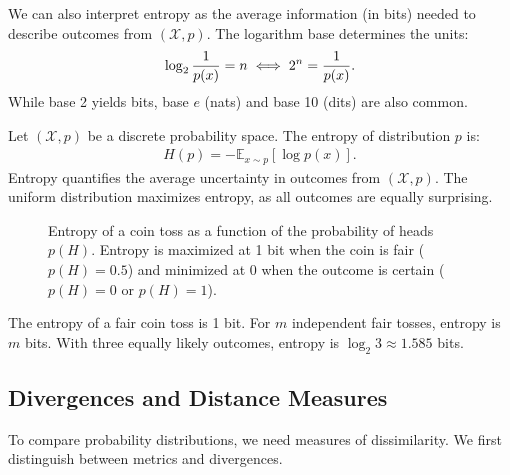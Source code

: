 We can also interpret entropy as the average information (in bits) needed to describe outcomes from $(\mathcal{X}, p)$. The logarithm base determines the units:
\begin{align}
	\label{eq:understand-log}
	\log_2{1 \over p(x)} = n \iff 2^n = {1 \over p(x)}.
\end{align}
While base 2 yields bits, base $e$ (nats) and base 10 (dits) are also common.

\begin{definition}
	Let $(\mathcal{X}, p)$ be a discrete probability space. The \textnormal{\sffamily entropy} of distribution $p$ is:
	\begin{align}
		\label{eq:entropy}
		H(p) = - \mathbb{E}_{x \sim p} \left[ \log{p(x)} \right].
	\end{align}
	Entropy quantifies the average uncertainty in outcomes from $(\mathcal{X}, p)$. The uniform distribution maximizes entropy, as all outcomes are equally surprising.
\end{definition}

\begin{figure}[H]
	\centering
	\caption{Entropy of a coin toss as a function of the probability of heads $p(H)$. Entropy is maximized at 1 bit when the coin is fair ($p(H)=0.5$) and minimized at 0 when the outcome is certain ($p(H)=0$ or $p(H)=1$).}%
	\label{fig:entropy-coin-toss}
\end{figure}

\begin{example}
	The entropy of a fair coin toss is 1 bit. For $m$ independent fair tosses, entropy is $m$ bits. With three equally likely outcomes, entropy is $\log_2{3} \approx 1.585$ bits.
\end{example}

\subsection{Divergences and Distance Measures}
To compare probability distributions, we need measures of dissimilarity. We first distinguish between metrics and divergences.

